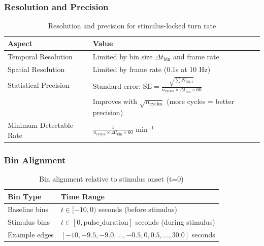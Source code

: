 \documentclass[
  11pt,
]{article}
\begin{document}
\hypertarget{resolution-and-precision-1}{%
\subsubsection{Resolution and
Precision}\label{resolution-and-precision-1}}

\begin{table}[H]
\centering
\small
\begin{tabular}{p{5cm}p{9cm}}
\hline
\textbf{Aspect} & \textbf{Value} \\
\hline
Temporal Resolution & Limited by bin size $\Delta t_{\text{bin}}$ and frame rate \\
Spatial Resolution & Limited by frame rate (0.1s at 10 Hz) \\
Statistical Precision & Standard error: $\text{SE} = \frac{\sqrt{\sum N_{\text{bin},i}}}{n_{\text{cycles}} \times \Delta t_{\text{bin}} \times 60}$ \\
 & Improves with $\sqrt{n_{\text{cycles}}}$ (more cycles = better precision) \\
Minimum Detectable Rate & $\frac{1}{n_{\text{cycles}} \times \Delta t_{\text{bin}} \times 60}$ min$^{-1}$ \\
\hline
\end{tabular}
\caption{Resolution and precision for stimulus-locked turn rate}

\end{table}

\hypertarget{bin-alignment}{%
\subsubsection{Bin Alignment}\label{bin-alignment}}

\begin{table}[H]
\centering
\small
\begin{tabular}{p{4cm}p{10cm}}
\hline
\textbf{Bin Type} & \textbf{Time Range} \\
\hline
Baseline bins & $t \in [-10, 0)$ seconds (before stimulus) \\
Stimulus bins & $t \in [0, \text{pulse\_duration}]$ seconds (during stimulus) \\
Example edges & $[-10, -9.5, -9.0, ..., -0.5, 0, 0.5, ..., 30.0]$ seconds \\
\hline
\end{tabular}
\caption{Bin alignment relative to stimulus onset (t=0)}

\end{table}
\end{document}
